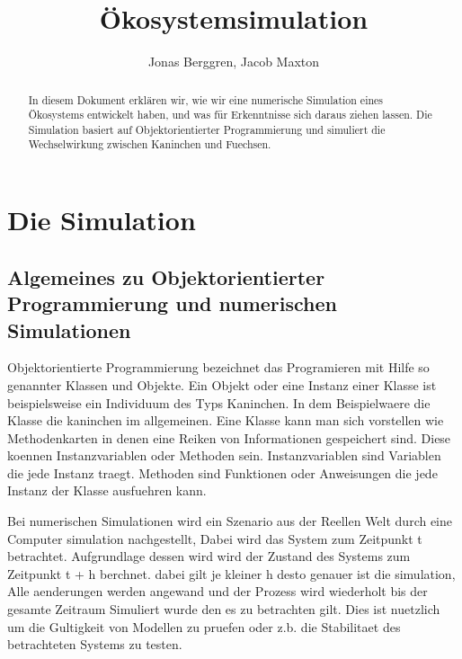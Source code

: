 \documentclass[12pt]{article}
\author{{\Large Jonas Berggren, Jacob Maxton}}
\title{{\myfont Ökosystemsimulation}}
\begin{document}
\maketitle
\begin{abstract}
In diesem Dokument erklären wir, wie wir eine numerische Simulation eines
	Ökosystems entwickelt haben, und was für Erkenntnisse sich daraus ziehen lassen.
Die Simulation basiert auf Objektorientierter Programmierung und simuliert die Wechselwirkung zwischen Kaninchen und Fuechsen.
\end{abstract}
\tableofcontents
\newpage
\section{Die Simulation}
\subsection{Algemeines zu Objektorientierter Programmierung und numerischen Simulationen}
Objektorientierte Programmierung bezeichnet das Programieren mit Hilfe so genannter Klassen und Objekte.
Ein Objekt oder eine Instanz einer Klasse ist beispielsweise ein Individuum des Typs Kaninchen.
In dem Beispielwaere die Klasse die kaninchen im allgemeinen.
Eine Klasse kann man sich vorstellen wie Methodenkarten in denen eine Reiken von Informationen gespeichert sind.
Diese koennen Instanzvariablen oder Methoden sein.
Instanzvariablen sind Variablen die jede Instanz traegt.
Methoden sind Funktionen oder Anweisungen die jede Instanz der Klasse ausfuehren kann.

Bei numerischen Simulationen wird ein Szenario aus der Reellen Welt durch eine Computer simulation nachgestellt,
Dabei wird das System zum Zeitpunkt t betrachtet.
Aufgrundlage dessen wird wird der Zustand des Systems zum Zeitpunkt t + h berchnet.
dabei gilt je kleiner h desto genauer ist die simulation,
Alle aenderungen werden angewand und der Prozess wird wiederholt bis der gesamte Zeitraum Simuliert wurde den es zu betrachten gilt.
Dies ist nuetzlich um die Gultigkeit von Modellen zu pruefen oder z.b. die Stabilitaet des betrachteten Systems zu testen.
\end{document}
